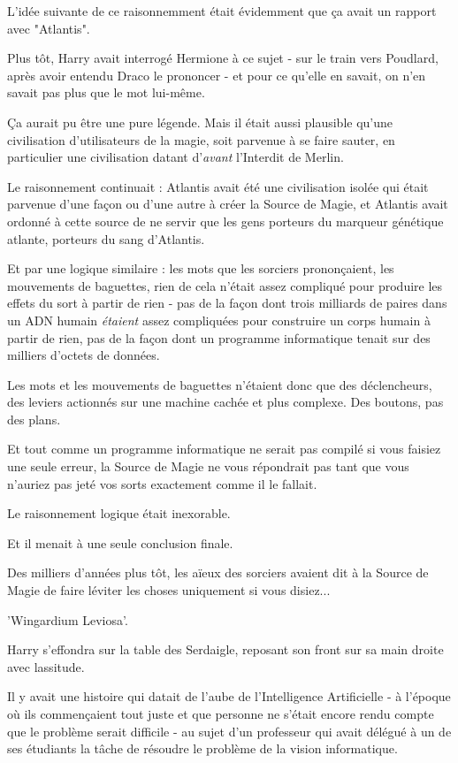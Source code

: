L'idée suivante de ce raisonnemment était évidemment que ça avait un rapport avec "Atlantis".

Plus tôt, Harry avait interrogé Hermione à ce sujet - sur le train vers Poudlard, après avoir entendu Draco le prononcer - et pour ce qu'elle en savait, on n'en savait pas plus que le mot lui-même.

Ça aurait pu être une pure légende. Mais il était aussi plausible qu'une civilisation d'utilisateurs de la magie, soit parvenue à se faire sauter, en particulier une civilisation datant d'\emph{avant} l'Interdit de Merlin.

Le raisonnement continuait : Atlantis avait été une civilisation isolée qui était parvenue d'une façon ou d'une autre à créer la Source de Magie, et Atlantis avait ordonné à cette source de ne servir que les gens porteurs du marqueur génétique atlante, porteurs du sang d'Atlantis.

Et par une logique similaire : les mots que les sorciers prononçaient, les mouvements de baguettes, rien de cela n'était assez compliqué pour produire les effets du sort à partir de rien - pas de la façon dont trois milliards de paires dans un ADN humain \emph{étaient} assez compliquées pour construire un corps humain à partir de rien, pas de la façon dont un programme informatique tenait sur des milliers d'octets de données.

Les mots et les mouvements de baguettes n'étaient donc que des déclencheurs, des leviers actionnés sur une machine cachée et plus complexe. Des boutons, pas des plans.

Et tout comme un programme informatique ne serait pas compilé si vous faisiez une seule erreur, la Source de Magie ne vous répondrait pas tant que vous n'auriez pas jeté vos sorts exactement comme il le fallait.

Le raisonnement logique était inexorable.

Et il menait à une seule conclusion finale.

Des milliers d'années plus tôt, les aïeux des sorciers avaient dit à la Source de Magie de faire léviter les choses uniquement si vous disiez...

'Wingardium Leviosa'.

Harry s'effondra sur la table des Serdaigle, reposant son front sur sa main droite avec lassitude.

Il y avait une histoire qui datait de l'aube de l'Intelligence Artificielle - à l'époque où ils commençaient tout juste et que personne ne s'était encore rendu compte que le problème serait difficile - au sujet d'un professeur qui avait délégué à un de ses étudiants la tâche de résoudre le problème de la vision informatique.

